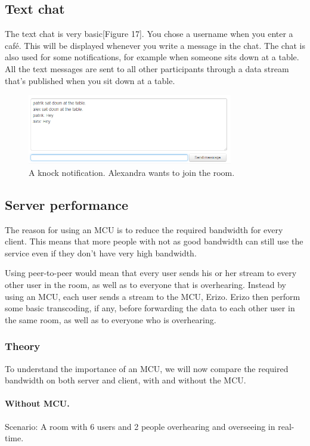 \documentclass[12pt, titlepage]{article}
\begin{document}
\subsection{Text chat}
The text chat is very basic[Figure 17]. You chose a username when you enter a café. This will be displayed whenever you write a message in the chat. The chat is also used for some notifications, for example when someone sits down at a table. All the text messages are sent to all other participants through a data stream that's published when you sit down at a table.
\begin{figure}[H]
  \centering
	\includegraphics[width=0.8\textwidth,keepaspectratio]{chat.png}
  \caption{A knock notification. Alexandra wants to join the room.}
\end{figure}
\subsection{Server performance}
The reason for using an MCU is to reduce the required bandwidth for every client. This means that more people with not as good bandwidth can still use the service even if they don't have very high bandwidth. 

Using peer-to-peer would mean that every user sends his or her stream to every other user in the room, as well as to everyone that is overhearing. Instead by using an MCU, each user sends a stream to the MCU, Erizo. Erizo then perform some basic transcoding, if any, before forwarding the data to each other user in the same room, as well as to everyone who is overhearing.

\subsubsection{Theory}
To understand the importance of an MCU, we will now compare the required bandwidth on both server and client, with and without the MCU.
\paragraph{Without MCU.}
Scenario: A room with 6 users and 2 people overhearing and overseeing in real-time.
\end{document}
